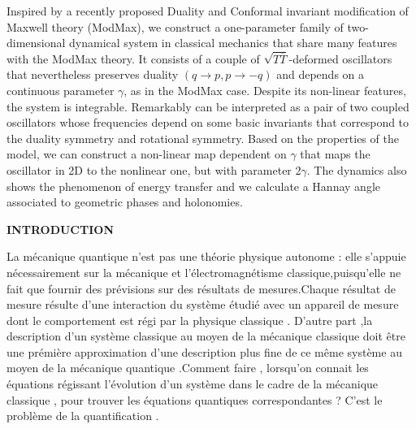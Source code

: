 \documentclass[12pt,a4paper, openany]{article}
\begin{document}
Inspired by a recently proposed Duality and Conformal invariant modification of Maxwell theory (ModMax), we construct a one-parameter family of two-dimensional dynamical system in classical mechanics that share many features with the ModMax theory. It consists of a couple of $\sqrt{T\overline{T}}$-deformed oscillators that nevertheless preserves duality $\left(q\rightarrow {p}, p\rightarrow {-q}\right)$ and depends on a continuous parameter $\gamma$, as in the ModMax case. Despite its non-linear features, the system is integrable. Remarkably can be interpreted as a pair of two coupled oscillators whose frequencies depend on some basic invariants that correspond to the duality symmetry and rotational symmetry. Based on the properties of the model, we can construct a non-linear map dependent on $\gamma$ that maps the oscillator in 2D to the nonlinear one, but with parameter 2$\gamma$. The dynamics also shows the phenomenon of energy transfer and we calculate a Hannay angle associated to geometric phases and holonomies.
\newpage


	
	\begin{center}
\textbf{INTRODUCTION}
\end{center}
	\hspace{0.5cm}La mécanique quantique n'est pas une théorie physique autonome : elle s'appuie nécessairement sur la mécanique et l'électromagnétisme classique,puisqu'elle ne fait que fournir des prévisions sur des résultats de mesures.Chaque résultat de mesure résulte d'une interaction du système étudié avec un appareil de mesure dont le comportement est régi par la physique classique . D'autre part ,la description d'un système classique au moyen de la mécanique classique doit \^{e}tre une prémière approximation d'une description plus fine de ce m\^{e}me système au moyen de la mécanique quantique .Comment faire , lorsqu'on connait les équations régissant l'évolution d'un système dans le cadre de la mécanique classique , pour trouver  les équations quantiques correspondantes ? C'est le problème de la quantification .\\ 
	
\end{document}
